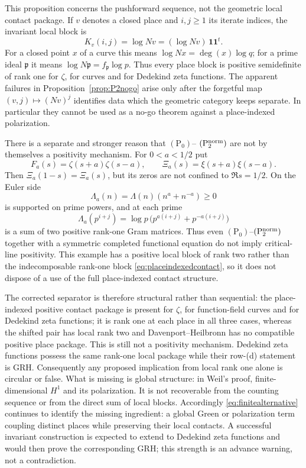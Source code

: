 \documentclass[11pt]{amsart}
\theoremstyle{definition}
\theoremstyle{remark}
\begin{document}
This proposition concerns the pushforward sequence, not the geometric local
contact package.  If $v$ denotes a closed place and $i,j\ge1$ its iterate
indices, the invariant local block is
\begin{equation}\label{eq:placeindexedcontact}
 K_v(i,j)=\log Nv=(\log Nv)\,\mathbf1\mathbf1^t.
\end{equation}
For a closed point $x$ of a curve this means $\log Nx=\deg(x)\log q$; for a
prime ideal $\mathfrak p$ it means
$\log N\mathfrak p=f_{\mathfrak p}\log p$.  Thus every place block is
positive semidefinite of rank one for $\zeta$, for curves and for Dedekind
zeta functions.  The apparent failures in Proposition~\ref{prop:P2nogo}
arise only after the forgetful map $(v,j)\mapsto (Nv)^j$ identifies data
which the geometric category keeps separate.  In particular they cannot be
used as a no-go theorem against a place-indexed polarization.

There is a separate and stronger reason that $\mathrm{(P_0)}$--
$\mathrm{(P_2^{\rm norm})}$ are not by themselves a positivity mechanism.  For
$0<a<1/2$ put
\[
 F_a(s)=\zeta(s+a)\zeta(s-a),\qquad
 \Xi_a(s)=\xi(s+a)\xi(s-a).
\]
Then $\Xi_a(1-s)=\Xi_a(s)$, but its zeros are not confined to
$\Re s=1/2$.  On the Euler side
\[
 \Lambda_a(n)=\Lambda(n)(n^a+n^{-a})\ge0
\]
is supported on prime powers, and at each prime
\[
 \Lambda_a(p^{i+j})=\log p\,
 \bigl(p^{a(i+j)}+p^{-a(i+j)}\bigr)
\]
is a sum of two positive rank-one Gram matrices.  Thus even
$\mathrm{(P_0)}$--$\mathrm{(P_2^{\rm norm})}$ together with a symmetric
completed functional equation do not imply critical-line positivity.  This
example has a positive local block of rank two rather than the indecomposable
rank-one block \eqref{eq:placeindexedcontact}, so it does not dispose of a
use of the full place-indexed contact structure.

The corrected separator is therefore structural rather than sequential:
the place-indexed positive contact package is present for $\zeta$, for
function-field curves and for Dedekind zeta functions; it is rank one at
each place in all three cases, whereas the shifted pair has local rank two
and Davenport--Heilbronn has no compatible positive place package.  This is
still not a positivity mechanism.  Dedekind zeta functions possess the same
rank-one local package while their row-(d) statement is GRH.  Consequently
any proposed implication from local rank one alone is circular or false.
What is missing is global structure: in Weil's proof, finite-dimensional
$H^1$ and its polarization.  It is not recoverable from the counting
sequence or from the direct sum of local blocks.  Accordingly
\eqref{eq:finitealternative} continues to identify the missing ingredient:
a global Green or polarization term coupling distinct places while
preserving their local contacts.  A successful invariant construction is
expected to extend to Dedekind zeta functions and would then prove the
corresponding GRH; this strength is an advance warning, not a contradiction.
\end{document}
